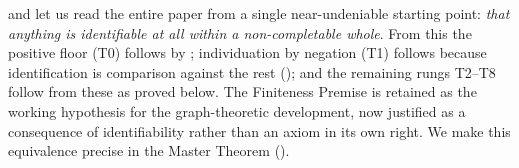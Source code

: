 \begin{remark}
\label{rem:identifiability}
 and  let us read the entire
paper from a single near-undeniable starting point: \emph{that anything is
identifiable at all within a non-completable whole}. From this the positive floor
\textup{(}T0\textup{)} follows by ; individuation by
negation \textup{(}T1\textup{)} follows because identification is comparison
against the rest \textup{(}\textup{)}; and the remaining
rungs T2--T8 follow from these as proved below. The Finiteness Premise is retained
as the working hypothesis for the graph-theoretic development, now justified as a
consequence of identifiability rather than an axiom in its own right. We make this
equivalence precise in the Master Theorem \textup{(}\textup{)}.
\end{remark}
